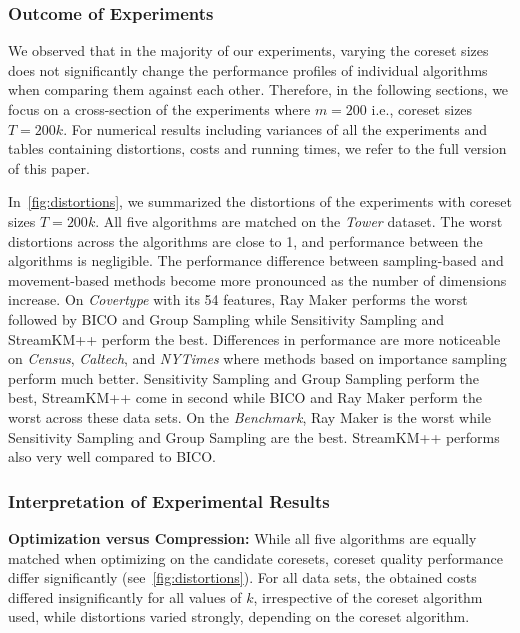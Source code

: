 \subsubsection*{Outcome of Experiments}
We observed that in the majority of our experiments, varying the coreset sizes does not significantly change the performance profiles of individual algorithms when comparing them against each other. Therefore, in the following sections, we focus on a cross-section of the experiments where $m=200$ i.e., coreset sizes $T=200k$.
For numerical results including variances of all the experiments and tables containing distortions, costs and running times, we refer to the full version of this paper.

In~\cref{fig:distortions}, we summarized the distortions of the experiments with coreset sizes $T=200k$. All five algorithms are matched on the \textit{Tower} dataset. The worst distortions across the algorithms are close to 1, and performance between the algorithms is negligible. The performance difference between sampling-based and movement-based methods become more pronounced as the number of dimensions increase. On \textit{Covertype} with its 54 features, Ray Maker performs the worst followed by BICO and Group Sampling while Sensitivity Sampling and StreamKM++ perform the best. Differences in performance are more noticeable on \textit{Census}, \textit{Caltech}, and \textit{NYTimes}  where methods based on importance sampling perform much better. Sensitivity Sampling and Group Sampling perform the best, StreamKM++ come in second while BICO and Ray Maker perform the worst across these data sets.
On the \textit{Benchmark}, Ray Maker is the worst while Sensitivity Sampling and Group Sampling are the best. StreamKM++ performs also very well compared to BICO.


\subsubsection*{Interpretation of Experimental Results}



{\bf Optimization versus Compression:}
While all five algorithms are equally matched when optimizing on the candidate coresets, coreset quality performance differ significantly (see~\cref{fig:distortions}). 
For all data sets, the obtained costs differed insignificantly for all values of $k$, 
irrespective of the coreset algorithm used, while distortions varied strongly, depending on the coreset algorithm.

